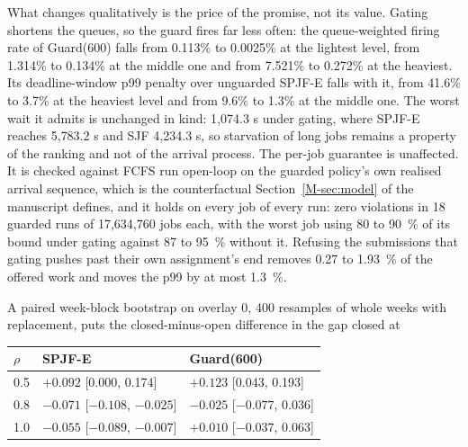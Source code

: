 \documentclass[mathematics,supfile,submit,moreauthors]{Definitions/mdpi}
\newcommand{\devnum}[1]{#1}
\begin{document}
What changes qualitatively is the price of the promise, not its value. Gating shortens
the queues, so the guard fires far less often: the queue-weighted firing rate of
Guard(\devnum{600}) falls from \devnum{0.113\%} to \devnum{0.0025\%} at the lightest
level, from \devnum{1.314\%} to \devnum{0.134\%} at the middle one and from
\devnum{7.521\%} to \devnum{0.272\%} at the heaviest. Its deadline-window p99 penalty
over unguarded SPJF-E falls with it, from \devnum{41.6\%} to \devnum{3.7\%} at the
heaviest level and from \devnum{9.6\%} to \devnum{1.3\%} at the middle one. The worst
wait it admits is unchanged in kind: \devnum{1{,}074.3} s under gating, where SPJF-E
reaches \devnum{5{,}783.2} s and SJF \devnum{4{,}234.3} s, so starvation of long jobs
remains a property of the ranking and not of the arrival process. The per-job guarantee
is unaffected. It is checked against FCFS run open-loop on the guarded policy's own
realised arrival sequence, which is the counterfactual Section~\ref*{M-sec:model} of the manuscript
defines, and it holds on every job of every run: zero violations in \devnum{18} guarded
runs of \devnum{17{,}634{,}760} jobs each, with the worst job using \devnum{80} to
\devnum{90}~\% of its bound under gating against \devnum{87} to \devnum{95}~\% without
it. Refusing the submissions that gating pushes past their own assignment's end removes
\devnum{0.27} to \devnum{1.93}~\% of the offered work and moves the p99 by at most
\devnum{1.3}~\%.

A paired week-block bootstrap on overlay \devnum{0}, \devnum{400} resamples of whole
weeks with replacement, puts the closed-minus-open difference in the gap closed at

\begin{center}
\begin{tabular}{lll}
\toprule
$\rho$ & SPJF-E & Guard(\devnum{600}) \\
\midrule
\devnum{0.5} & \devnum{$+0.092$} [\devnum{0.000}, \devnum{0.174}] & \devnum{$+0.123$} [\devnum{0.043}, \devnum{0.193}] \\
\devnum{0.8} & \devnum{$-0.071$} [\devnum{$-0.108$}, \devnum{$-0.025$}] & \devnum{$-0.025$} [\devnum{$-0.077$}, \devnum{0.036}] \\
\devnum{1.0} & \devnum{$-0.055$} [\devnum{$-0.089$}, \devnum{$-0.007$}] & \devnum{$+0.010$} [\devnum{$-0.037$}, \devnum{0.063}] \\
\bottomrule
\end{tabular}
\end{center}
\end{document}
